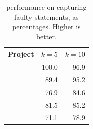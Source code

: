 \documentclass{article}
\begin{document}
\begin{table}[H]
  \small
	\centering
	\setlength{\tabcolsep}{4pt}
	\begin{tabular}{lrr}
		\toprule
		Project             &  \multicolumn{1}{c}{$k=5$} & \multicolumn{1}{c}{$k=10$} \\ %
		\midrule

        \lang{}            & 100.0 & 96.9\\
        \cmath{}           & 89.4 & 95.2\\
		\chart{}			& 76.9 & 84.6 \\
        \jtime{}            & 81.5 & 85.2\\
        \mockito{}          & 71.1 & 78.9\\

		\bottomrule
	\end{tabular}
	\caption {\ds{} performance on capturing faulty statements, as
     percentages. Higher is better.}
	\label{tab:red}
   \label{tab:ds-cases-captured}   
\end{table}
\normalsize


\end{document}
